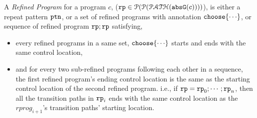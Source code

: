 A \emph{Refined Program} for a program $c$, ($\mathtt{rp} \in \mathcal{P}(\mathcal{P}(\mathcal{PATH}(\mathtt{abs}{\mathtt{G}}(c))))$),
is either a repeat pattern $\mathtt{ptn}$,
or a set of refined programs with annotation $\rpchoose{ \cdots }$, or sequence of refined program $\mathtt{rp}; \mathtt{rp}$
satisfying,
\begin{itemize}
  \item every refined 
  programs in a same set, $\rpchoose{ \cdots }$
  starts and ends with the same control location,
  \item and for every two sub-refined programs following each other in a sequence,
    the first refined program's ending control location is the same 
    as the starting control location of the second refined program.
    i.e., if
    $\mathtt{rp} = \mathtt{rp}_0; \cdots; \mathtt{rp}_n$,
    then all the transition paths in $\mathtt{rp}_i$ ends with the same control location as 
    the $rprog_{i + 1}$'s transition paths' starting location.
\end{itemize}
%

